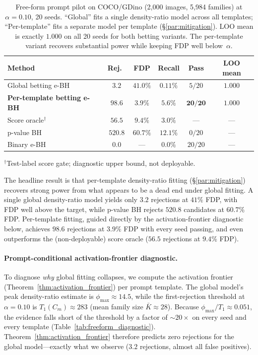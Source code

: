 \documentclass{article}
\theoremstyle{remark}
\newcommand{\1}{\mathbf{1}}
\begin{document}
\begin{table}[h]
\centering
\small
\begin{tabular*}{\linewidth}{@{\extracolsep{\fill}}lccccc@{}}
\toprule
Method & Rej.\ & FDP & Recall & Pass & LOO mean \\
\midrule
Global betting e-BH & $3.2$ & $41.0\%$ & $0.11\%$ & $5/20$ & $1.000$ \\
\textbf{Per-template betting e-BH} & $\mathbf{98.6}$ & $\mathbf{3.9\%}$ & $\mathbf{5.6\%}$ & $\mathbf{20/20}$ & $\mathbf{1.000}$ \\
Score oracle$^{\dagger}$ & $56.5$ & $9.4\%$ & $3.0\%$ & --- & --- \\
p-value BH & $520.8$ & $60.7\%$ & $12.1\%$ & $0/20$ & --- \\
Binary e-BH & $0.0$ & --- & $0.0\%$ & $20/20$ & --- \\
\bottomrule
\end{tabular*}
\vspace{1pt}

\parbox{\linewidth}{\footnotesize
$^{\dagger}$Test-label score gate; diagnostic upper bound, not deployable.}
\caption{Free-form prompt pilot on COCO/GDino (2{,}000 images, 5{,}984
families) at $\alpha=0.10$, 20 seeds.  ``Global'' fits a single
density-ratio model across all templates; ``Per-template'' fits a separate
model per template (\S\ref{par:mitigation}).  LOO mean is exactly $1.000$
on all 20 seeds for both betting variants.  The per-template variant
recovers substantial power while keeping FDP well below~$\alpha$.}
\label{tab:freeform_pilot}
\end{table}

The headline result is that per-template density-ratio fitting
(\S\ref{par:mitigation}) recovers strong power from what appears to be a
dead end under global fitting.  A single global density-ratio model yields
only $3.2$ rejections at $41\%$ FDP, with FDP well above the target,
while p-value BH rejects $520.8$ candidates at $60.7\%$ FDP.  Per-template fitting, guided
directly by the activation-frontier diagnostic below, achieves $98.6$
rejections at $3.9\%$ FDP with every seed passing, and even outperforms the
(non-deployable) score oracle ($56.5$ rejections at $9.4\%$ FDP).

\paragraph{Prompt-conditional activation-frontier diagnostic.}
To diagnose \emph{why} global fitting collapses, we compute the activation
frontier (Theorem~\ref{thm:activation_frontier}) per prompt template.  The
global model's peak density-ratio estimate is
$\phi_{\max}\!\approx\!14.5$, while the first-rejection threshold at
$\alpha\!=\!0.10$ is $T_1(C_m)\!\approx\!283$ (mean family size
$\bar{K}\!\approx\!28$).  Because $\phi_{\max}/T_1 \approx 0.051$, the
evidence falls short of the threshold by a factor of
${\sim}20{\times}$ on every seed and every template
(Table~\ref{tab:freeform_diagnostic}).
Theorem~\ref{thm:activation_frontier} therefore predicts zero
rejections for the global model---exactly what we observe ($3.2$
rejections, almost all false positives).
\end{document}

